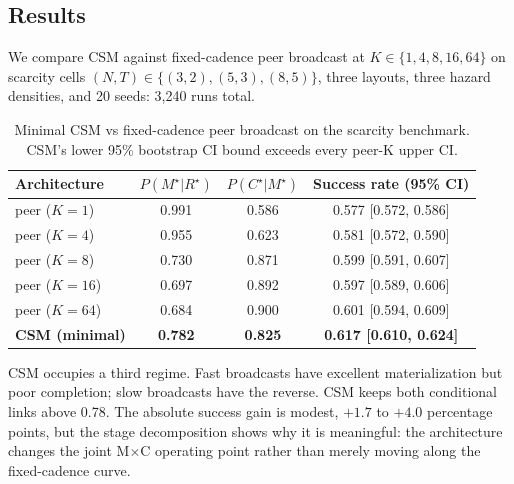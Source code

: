\documentclass{article}
\begin{document}
\subsection{Results}

We compare CSM against fixed-cadence peer broadcast at
$K \in \{1,4,8,16,64\}$ on scarcity cells
$(N,T){\in}\{(3,2),(5,3),(8,5)\}$, three layouts, three hazard
densities, and 20 seeds: 3{,}240 runs total.

\begin{table}[ht]
\caption{Minimal CSM vs fixed-cadence peer broadcast on the scarcity benchmark. CSM's lower 95\% bootstrap CI bound exceeds every peer-K upper CI.}
\label{tab:csm-results}
\centering
\small
\begin{tabular}{l c c c}
\toprule
Architecture & $P(M^\star|R^\star)$ & $P(C^\star|M^\star)$ & Success rate (95\% CI) \\
\midrule
peer ($K{=}1$)  & 0.991 & 0.586 & 0.577 [0.572, 0.586] \\
peer ($K{=}4$)  & 0.955 & 0.623 & 0.581 [0.572, 0.590] \\
peer ($K{=}8$)  & 0.730 & 0.871 & 0.599 [0.591, 0.607] \\
peer ($K{=}16$) & 0.697 & 0.892 & 0.597 [0.589, 0.606] \\
peer ($K{=}64$) & 0.684 & 0.900 & 0.601 [0.594, 0.609] \\
\textbf{CSM (minimal)} & \textbf{0.782} & \textbf{0.825} & \textbf{0.617 [0.610, 0.624]} \\
\bottomrule
\end{tabular}
\end{table}

CSM occupies a third regime. Fast broadcasts have excellent
materialization but poor completion; slow broadcasts have the reverse.
CSM keeps both conditional links above 0.78. The absolute success gain
is modest, $+1.7$ to $+4.0$ percentage points, but the stage
decomposition shows why it is meaningful: the architecture changes the
joint M$\times$C operating point rather than merely moving along the
fixed-cadence curve.
\end{document}
